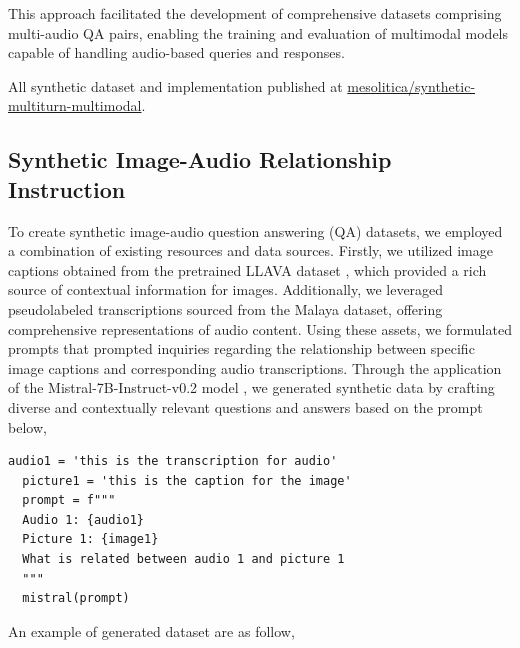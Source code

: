 \documentclass[preprint]{article}
\begin{document}
This approach facilitated the development of comprehensive datasets comprising multi-audio QA pairs, enabling the training and evaluation of multimodal models capable of handling audio-based queries and responses.

All synthetic dataset and implementation published at \href{https://huggingface.co/datasets/mesolitica/synthetic-multiturn-multimodal#multi-audio}{mesolitica/synthetic-multiturn-multimodal}.

\subsection{Synthetic Image-Audio Relationship Instruction}

To create synthetic image-audio question answering (QA) datasets, we employed a combination of existing resources and data sources. Firstly, we utilized image captions obtained from the pretrained LLAVA dataset \cite{liu2023visual}, which provided a rich source of contextual information for images. Additionally, we leveraged pseudolabeled transcriptions sourced from the Malaya dataset, offering comprehensive representations of audio content. Using these assets, we formulated prompts that prompted inquiries regarding the relationship between specific image captions and corresponding audio transcriptions. Through the application of the Mistral-7B-Instruct-v0.2 model \cite{jiang2023mistral}, we generated synthetic data by crafting diverse and contextually relevant questions and answers based on the prompt below,

\begin{lstlisting}[breaklines=true]
  audio1 = 'this is the transcription for audio'
  picture1 = 'this is the caption for the image'
  prompt = f"""
  Audio 1: {audio1} 
  Picture 1: {image1}
  What is related between audio 1 and picture 1
  """
  mistral(prompt)
\end{lstlisting}

An example of generated dataset are as follow,
\end{document}
